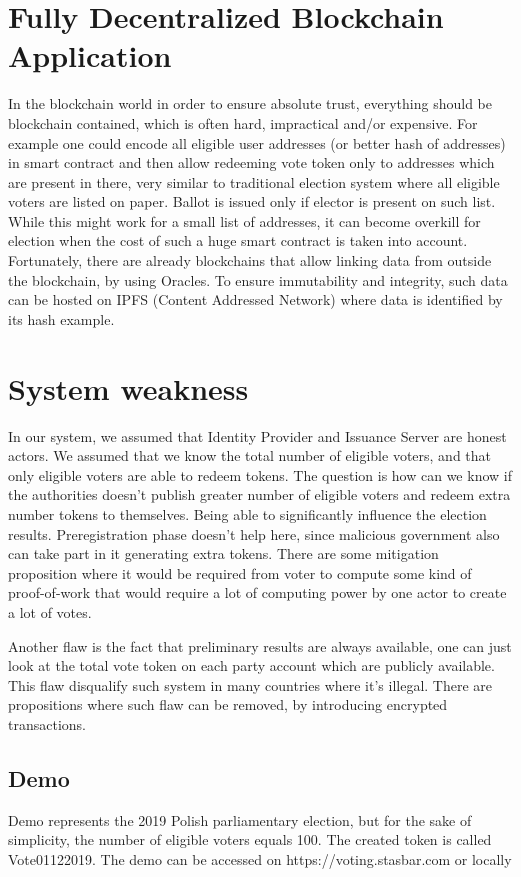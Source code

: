 \documentclass[runningheads]{llncs}
\begin{document}
\section{Fully Decentralized Blockchain Application}
In the blockchain world in order to ensure absolute trust, everything should be blockchain contained, which is often hard, impractical and/or expensive. For example one could encode all eligible user addresses (or better hash of addresses) in smart contract and then allow redeeming vote token only to addresses which are present in there, very similar to traditional election system where all eligible voters are listed on paper. Ballot is issued only if elector is present on such list. While this might work for a small list of addresses, it can become overkill for election when the cost of such a huge smart contract is taken into account. Fortunately, there are already blockchains that allow linking data from outside the blockchain, by using Oracles. To ensure immutability and integrity, such data can be hosted on IPFS (Content Addressed Network) where data is identified by its hash example.

\section{System weakness}
In our system, we assumed that Identity Provider and Issuance Server are honest actors. We assumed that we know the total number of eligible voters, and that only eligible voters are able to redeem tokens. The question is how can we know if the authorities doesn't publish greater number of eligible voters and redeem extra number tokens to themselves. Being able to significantly influence the election results. Preregistration phase doesn't help here, since malicious government also can take part in it generating extra tokens. There are some mitigation proposition where it would be required from voter to compute some kind of proof-of-work that would require a lot of computing power by one actor to create a lot of votes.

Another flaw is the fact that preliminary results are always available, one can just look at the total vote token on each party account which are publicly available. This flaw disqualify such system in many countries where it's illegal. There are propositions where such flaw can be removed, by introducing encrypted transactions.

\subsection{Demo}
Demo represents the 2019 Polish parliamentary election, but for the sake of simplicity, the number of eligible voters equals 100. The created token is called Vote01122019. The demo can be accessed on https://voting.stasbar.com or locally
\end{document}
